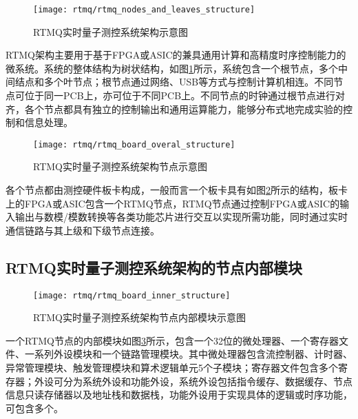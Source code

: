 \begin{figure}
    \centering
    \caption[RTMQ实时量子测控系统架构示意图]{RTMQ实时量子测控系统架构示意图\label{fig:rtmq_nodes_and_leaves_structure}}
    \texttt{[image: rtmq/rtmq\_nodes\_and\_leaves\_structure]}
\end{figure}

RTMQ架构主要用于基于FPGA或ASIC的兼具通用计算和高精度时序控制能力的微系统。系统的整体结构为树状结构，如图\ref{fig:rtmq_nodes_and_leaves_structure}所示，系统包含一个根节点，多个中间结点和多个叶节点；根节点通过网络、USB等方式与控制计算机相连。不同节点可位于同一PCB上，亦可位于不同PCB上。不同节点的时钟通过根节点进行对齐，各个节点都具有独立的控制输出和通用运算能力，能够分布式地完成实验的控制和信息处理。

\begin{figure}
    \centering
    \caption[RTMQ实时量子测控系统架构节点示意图]{RTMQ实时量子测控系统架构节点示意图\label{fig:rtmq_board_overal_structure}}
    \texttt{[image: rtmq/rtmq\_board\_overal\_structure]}
\end{figure}

各个节点都由测控硬件板卡构成，一般而言一个板卡具有如图\ref{fig:rtmq_board_overal_structure}所示的结构，板卡上的FPGA或ASIC包含一个RTMQ节点，RTMQ节点通过控制FPGA或ASIC的输入输出与数模/模数转换等各类功能芯片进行交互以实现所需功能，同时通过实时通信链路与其上级和下级节点连接。



\subsection[RTMQ实时量子测控系统架构的节点内部模块]{RTMQ实时量子测控系统架构的节点内部模块\label{section:rtmq_inner_module}}

\begin{figure}
    \centering
    \caption[RTMQ实时量子测控系统架构节点内部模块示意图]{RTMQ实时量子测控系统架构节点内部模块示意图\label{fig:rtmq_board_inner_structure}}
    \texttt{[image: rtmq/rtmq\_board\_inner\_structure]}
\end{figure}

一个RTMQ节点的内部模块如图\ref{fig:rtmq_board_inner_structure}所示，包含一个32位的微处理器、一个寄存器文件、一系列外设模块和一个链路管理模块。其中微处理器包含流控制器、计时器、异常管理模块、触发管理模块和算术逻辑单元5个子模块；寄存器文件包含多个寄存器；外设可分为系统外设和功能外设，系统外设包括指令缓存、数据缓存、节点信息只读存储器以及地址栈和数据栈，功能外设用于实现具体的逻辑或时序功能，可包含多个。


